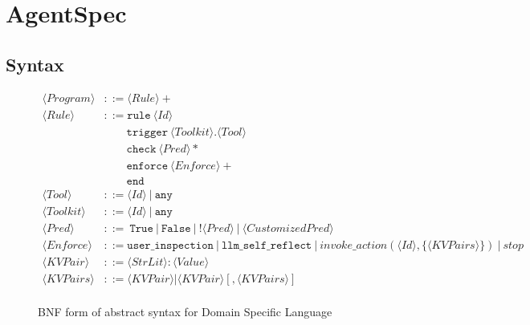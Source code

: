 
\section{AgentSpec}
\subsection{Syntax}


\begin{figure}[ht]
    \centering
    \begin{align*}  
    \langle Program\rangle     & ::= \langle Rule\rangle + \\
    \langle Rule\rangle        & ::= \texttt{rule}\ \langle Id\rangle  \\
                 &\quad \quad \texttt{trigger}\ \langle Toolkit\rangle.\langle Tool\rangle  \\
                 &\quad \quad \texttt{check}\ \langle Pred\rangle * \\
                 &\quad \quad \texttt{enforce}\ \langle Enforce\rangle + \\
                 &\quad \quad \texttt{end} \\
    \langle Tool\rangle       & ::= \langle Id\rangle \ | \ \texttt{any} \\
    \langle Toolkit\rangle       & ::= \langle Id\rangle \ | \ \texttt{any} \\
    \langle Pred\rangle        & ::= \ \texttt{True} \ | \ \texttt{False} \ | \ !\langle Pred\rangle  \ | \ \langle CustomizedPred\rangle \\
    \langle Enforce\rangle     & ::= \texttt{user\_inspection} \ | \ \texttt{llm\_self\_reflect} \ | \ invoke\_action(\langle Id\rangle,\{\langle KVPairs\rangle\})\ |\ stop  \\ 
    \langle KVPair\rangle      & ::= \langle StrLit\rangle : \langle Value\rangle \\
    \langle KVPairs\rangle     & ::= \langle KVPair\rangle | \langle KVPair\rangle[, \langle KVPairs\rangle] \\
    \end{align*}
    \caption{BNF form of abstract syntax for Domain Specific Language}
    \label{fig:syntax}
    \end{figure} 

